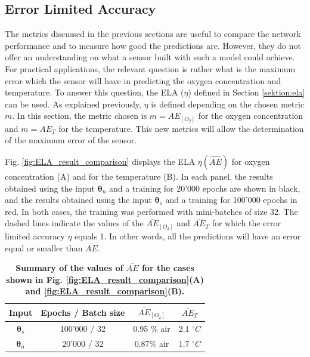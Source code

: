 \documentclass[final,5p,times,twocolumn]{elsarticle}
\begin{document}
\subsection{Error Limited Accuracy}

The metrics discussed in the previous sections are useful to compare the network performance and to measure how good the predictions are. However, they do not offer an understanding on what a sensor built with such a model could achieve. For practical applications, the relevant question is rather what is the maximum error which the sensor will have in predicting the oxygen concentration and temperature. To answer this question, the ELA ($\eta$) defined in Section \ref{sektion:ela} can be used. As explained previously, $\eta$ is defined depending on the chosen metric $m$. In this section, the metric chosen is $m=AE_{[O_2]}$ for the oxygen concentration and $m=AE_{T}$ for the temperature. This new metrics will allow the determination of the maximum error of the sensor. 

Fig. \ref{fig:ELA_result_comparison} displays the ELA $\eta(\widehat {AE})$ for oxygen concentration (A) and for the temperature (B). In each panel, the results obtained using the input ${\pmb \theta}_n$ and a training for 20'000 epochs are shown in black, and the results obtained using the input ${\pmb \theta}_s$ and a training for 100'000 epochs in red. In both cases, the training was performed with mini-batches of size 32.
The dashed lines indicate the values of the $\overline{AE}_{[O_2]}$ and $\overline{AE}_{T}$ for which the error limited accuracy $\eta$ equals 1. In other words, all the predictions will have an error equal or smaller than $\overline{AE}$.

\begin{table}[t!]
\centering
\caption {\bf Summary of the values of $\overline{AE}$ for the cases shown in Fig. \ref{fig:ELA_result_comparison}(A) and \ref{fig:ELA_result_comparison}(B).}
\begin{tabular}{ cccc}
\smallskip 
 Input & Epochs / Batch size & $\overline{AE}_{[O_2]}$ & $\overline{AE}_{T}$  \\ 
 \hline
${\pmb \theta}_s$ & 100'000 / 32 & 0.95 \% air & 2.1 $^\circ C$\\ 
${\pmb \theta}_n $ & 20'000 / 32 & 0.87\% air & 1.7 $^\circ C$\\ 
\end{tabular}
\label{table:ela}
\end{table}
\end{document}
